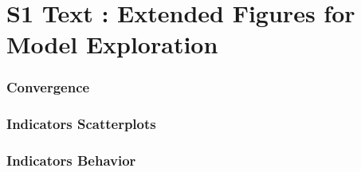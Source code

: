 



\section*{S1 Text : Extended Figures for Model Exploration}


\subsubsection*{Convergence}




\begin{figure}
\centering
\caption{}
\label{}
\end{figure}




\subsubsection*{Indicators Scatterplots}






\subsubsection*{Indicators Behavior}




\begin{figure}
\centering
\caption{}
\label{}
\end{figure}





